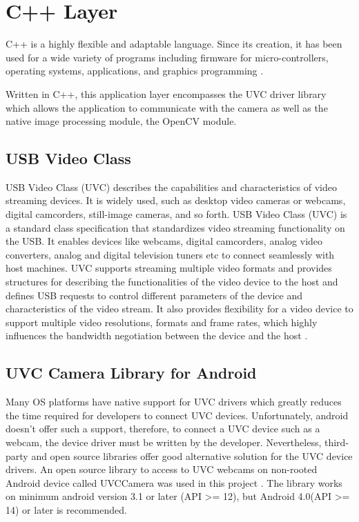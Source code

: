 \section{C++ Layer}


C++ is a highly flexible and adaptable language. Since its creation, it has been used for a wide variety of programs including firmware for micro-controllers, operating systems, applications, and graphics programming \parencite{cpp}.

Written in C++, this application layer encompasses the UVC driver library which allows the application to communicate with the camera as well as the native image processing module, the OpenCV module.

\subsection{USB Video Class}

USB Video Class (UVC) describes the capabilities and characteristics of video streaming devices. It is widely used, such as desktop video cameras or webcams, digital camcorders, still-image cameras, and so forth. USB Video Class (UVC) is a standard class specification that standardizes video streaming functionality on the USB. It enables devices like webcams, digital camcorders, analog video converters, analog and digital television tuners etc to connect seamlessly with host machines. UVC supports streaming multiple video formats and provides structures for describing the functionalities of the video device to the host and defines USB requests to control different parameters of the device and characteristics of the video stream. It also provides flexibility for a video device to support multiple video resolutions, formats and frame rates, which highly influences the bandwidth negotiation between the device and the host \parencite{uvc}.

\subsection{UVC Camera Library for Android}
Many OS platforms have native support for UVC drivers which greatly reduces the time required for developers to connect UVC devices. Unfortunately, android doesn’t offer such a support, therefore, to connect a UVC device such as a webcam, the device driver must be written by the developer. 
Nevertheless, third-party and open source libraries offer good alternative solution for the UVC device drivers. An open source library to access to UVC webcams on non-rooted Android device called UVCCamera was used in this project \parencite{uvcCamera}. The library works on minimum android version 3.1 or later (API >= 12), but Android 4.0(API >= 14) or later is recommended.


